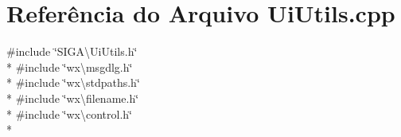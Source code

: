 \section{Referência do Arquivo Ui\+Utils.\+cpp}
\label{_ui_utils_8cpp}
{\ttfamily \#include \char`\"{}S\+I\+G\+A\textbackslash{}\+Ui\+Utils.\+h\char`\"{}}\\*
{\ttfamily \#include \char`\"{}wx\textbackslash{}msgdlg.\+h\char`\"{}}\\*
{\ttfamily \#include \char`\"{}wx\textbackslash{}stdpaths.\+h\char`\"{}}\\*
{\ttfamily \#include \char`\"{}wx\textbackslash{}filename.\+h\char`\"{}}\\*
{\ttfamily \#include \char`\"{}wx\textbackslash{}control.\+h\char`\"{}}\\*
